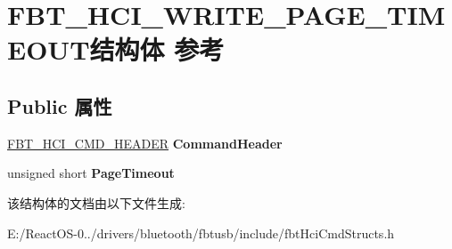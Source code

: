 \hypertarget{struct_f_b_t___h_c_i___w_r_i_t_e___p_a_g_e___t_i_m_e_o_u_t}{}\section{F\+B\+T\+\_\+\+H\+C\+I\+\_\+\+W\+R\+I\+T\+E\+\_\+\+P\+A\+G\+E\+\_\+\+T\+I\+M\+E\+O\+U\+T结构体 参考}
\label{struct_f_b_t___h_c_i___w_r_i_t_e___p_a_g_e___t_i_m_e_o_u_t}
\subsection*{Public 属性}
\begin{DoxyCompactItemize}
\item 
\mbox{\label{struct_f_b_t___h_c_i___w_r_i_t_e___p_a_g_e___t_i_m_e_o_u_t_af073b73173ebb73d07713a279587ed40}} 
\hyperlink{struct_f_b_t___h_c_i___c_m_d___h_e_a_d_e_r}{F\+B\+T\+\_\+\+H\+C\+I\+\_\+\+C\+M\+D\+\_\+\+H\+E\+A\+D\+ER} {\bfseries Command\+Header}
\item 
\mbox{\label{struct_f_b_t___h_c_i___w_r_i_t_e___p_a_g_e___t_i_m_e_o_u_t_a321fad4910a1a79c2464ec6c7b97a022}} 
unsigned short {\bfseries Page\+Timeout}
\end{DoxyCompactItemize}


该结构体的文档由以下文件生成\+:\begin{DoxyCompactItemize}
\item 
E\+:/\+React\+O\+S-\/0../drivers/bluetooth/fbtusb/include/fbt\+Hci\+Cmd\+Structs.\+h\end{DoxyCompactItemize}
